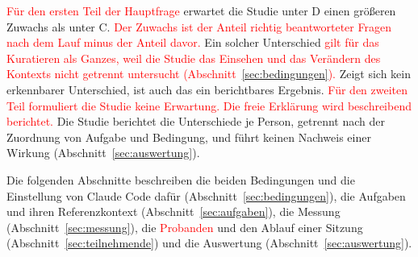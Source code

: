 

\textcolor{red}{Für den ersten Teil der Hauptfrage} erwartet die Studie unter D einen größeren Zuwachs als unter C. \textcolor{red}{Der Zuwachs ist der Anteil richtig beantworteter Fragen nach dem Lauf minus der Anteil davor.} Ein solcher Unterschied \textcolor{red}{gilt für das Kuratieren als Ganzes, weil die Studie das Einsehen und das Verändern des Kontexts nicht getrennt untersucht (Abschnitt~\ref{sec:bedingungen}).} Zeigt sich kein erkennbarer Unterschied, ist auch das ein berichtbares Ergebnis. \textcolor{red}{Für den zweiten Teil formuliert die Studie keine Erwartung. Die freie Erklärung wird beschreibend berichtet.} Die Studie berichtet die Unterschiede je Person, getrennt nach der Zuordnung von Aufgabe und Bedingung, und führt keinen Nachweis einer Wirkung (Abschnitt~\ref{sec:auswertung}).

Die folgenden Abschnitte beschreiben die beiden Bedingungen und die Einstellung von Claude Code dafür (Abschnitt~\ref{sec:bedingungen}), die Aufgaben und ihren Referenzkontext (Abschnitt~\ref{sec:aufgaben}), die Messung (Abschnitt~\ref{sec:messung}), die \textcolor{red}{Probanden} und den Ablauf einer Sitzung (Abschnitt~\ref{sec:teilnehmende}) und die Auswertung (Abschnitt~\ref{sec:auswertung}).

